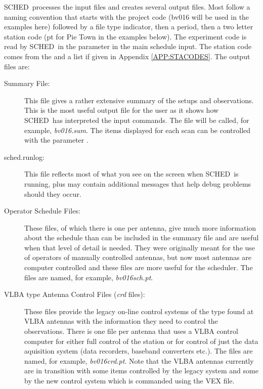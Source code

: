 \documentclass{report}
\newcommand{\schedb}{{\sc SCHED~}}
\begin{document}
\schedb processes the input files and creates several output
files.  Most follow a naming convention that starts with
the project code (bv016 will be used in the examples here) followed
by a file type indicator, then a period, then a two letter station
code (pt for Pie Town in the examples below).  The experiment code
is read by \schedb in the  parameter
in the main schedule input.  The station code comes from the
 and a list if given in
Appendix \ref{APP:STACODES}. The output files are:

\begin{description}

\item[Summary File:] This file gives a rather extensive summary of the
setups and observations.  This is the most useful output file for the
user as it shows how \schedb has interpreted the input commands.  The
file will be called, for example, {\sl bv016.sum}.  The items displayed
for each scan can be controlled with the parameter .

\item[sched.runlog:] This file reflects most of what you see on the
screen when \schedb is running, plus may contain additional messages
that help debug problems should they occur.

\item[Operator Schedule Files:] These files, of which there is one per
antenna, give much more information about the schedule than can be
included in the summary file and are useful when that level of detail
is needed.  They were originally meant for the use of operators of
manually controlled antennas, but now most antennas are computer
controlled and these files are more useful for the scheduler.  The
files are named, for example, {\sl bv016sch.pt}.

\item[VLBA type Antenna Control Files ({\sl crd} files):] These files
provide the legacy on-line control systems of the type found at VLBA
antennas with the information they need to control the observations.
There is one file per antenna that uses a VLBA control computer for
either full control of the station or for control of just the data
aquisition system (data recorders, baseband converters etc.).  The
files are named, for example, {\sl bv016crd.pt}.  Note that the
VLBA antennas currently are in transition with some items controlled
by the legacy system and some by the new control system which is
commanded using the VEX file.


\end{description}
\end{document}
